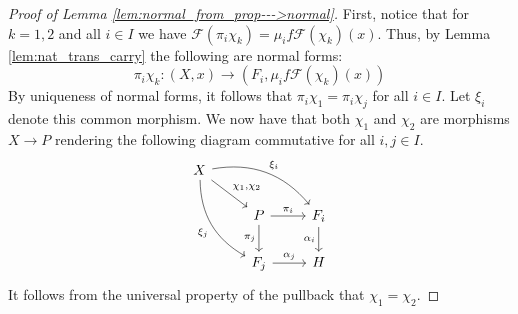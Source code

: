 \documentclass[12pt]{article}
\theoremstyle{plain}
\theoremstyle{definition}
\newcommand{\scr}[1]{\mathscr{#1}}
\newcommand{\lto}{\longrightarrow}
\begin{document}
\begin{proof}[Proof of Lemma \ref{lem:normal_from_prop--->normal}]
		First, notice that for $k = 1,2$ and all $i \in I$ we have $\scr{F}(\pi_i \chi_k) = \mu_i f \scr{F}(\chi_k)(x)$. Thus, by Lemma \ref{lem:nat_trans_carry} the following are normal forms:
		\begin{equation}
			\pi_i \chi_k: (X,x) \lto (F_i, \mu_i f \scr{F}(\chi_k)(x))
			\end{equation}
		By uniqueness of normal forms, it follows that $\pi_i \chi_1 = \pi_i \chi_j$ for all $i \in I$. Let $\xi_i$ denote this common morphism. We now have that both $\chi_1$ and $\chi_2$ are morphisms $X \lto P$ rendering the following diagram commutative for all $i, j \in I$.
		\begin{equation}
			\begin{tikzcd}
				X\arrow[rrd, bend left,"{\xi_i}"]\arrow[ddr,swap,bend right,"{\xi_j}"]\arrow[dr,"{\chi_1,\chi_2}"]\\
				& P\arrow[r,"{\pi_i}"]\arrow[d,swap,"{\pi_j}"] & F_i\arrow[d,swap,"{\alpha_i}"]\\
				& F_j\arrow[r,"{\alpha_j}"] & H
				\end{tikzcd}
			\end{equation}
		It follows from the universal property of the pullback that $\chi_1 = \chi_2$.
		\end{proof}
\end{document}
